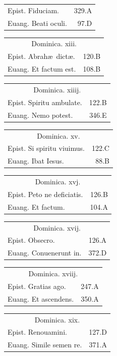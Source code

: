 \documentclass[a5paper,10pt]{book}
\def\ae{æ}
\begin{document}
\begin{multicols}{2}
\begin{tabular}{l r}
Epist. Fiduciam. & 329.A\\
Euang. Beati oculi. & 97.D\\
\end{tabular}
\begin{tabular}{l r}
\multicolumn{2}{c}{\color{red} Dominica. xiii.}\\
Epist. Abrah\ae \ dict\ae . & 120.B\\
Euang. Et factum est. & 108.B\\
\end{tabular}
\begin{tabular}{l r}
\multicolumn{2}{c}{\color{red} Dominica. xiiij.}\\
Epist. Spiritu ambulate. & 122.B\\
Euang. Nemo potest. & 346.E\\
\end{tabular}
\begin{tabular}{l r}
\multicolumn{2}{c}{\color{red} Dominica. xv.}\\
Epist. Si spiritu viuimus. & 122.C\\
Euang. Ibat Iesus. & 88.B\\
\end{tabular}
\begin{tabular}{l r}
\multicolumn{2}{c}{\color{red} Dominica. xvj.}\\
Epist. Peto ne deficiatis. & 126.B\\
Euang. Et factum. & 104.A\\
\end{tabular}
\begin{tabular}{l r}
\multicolumn{2}{c}{\color{red} Dominica. xvij.}\\
Epist. Obsecro. & 126.A\\
Euang. Conuenerunt in. & 372.D\\
\end{tabular}
\begin{tabular}{l r}
\multicolumn{2}{c}{\color{red} Dominica. xviij.}\\
Epist. Gratias ago. & 247.A\\
Euang. Et ascendens. & 350.A\\
\end{tabular}
\begin{tabular}{l r}
\multicolumn{2}{c}{\color{red} Dominica. xix.}\\
Epist. Renouamini. & 127.D\\
Euang. Simile semen re. & 371.A\\
\end{tabular}

\end{multicols}
\end{document}
